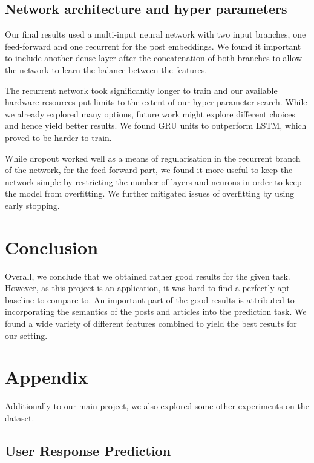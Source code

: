 \documentclass[acmsmall]{acmart}
\begin{document}
\subsection{Network architecture and hyper parameters}
Our final results used a multi-input neural network with two input branches, one feed-forward and one recurrent for the post embeddings. We found it important to include another dense layer after the concatenation of both branches to allow the network to learn the balance between the features.

The recurrent network took significantly longer to train and our available hardware resources put limits to the extent of our hyper-parameter search. While we already explored many options, future work might explore different choices and hence yield better results. We found GRU units to outperform LSTM, which proved to be harder to train. 

While dropout worked well as a means of regularisation in the recurrent branch of the network, for the feed-forward part, we found it more useful to keep the network simple by restricting the number of layers and neurons in order to keep the model from overfitting. We further mitigated issues of overfitting by using early stopping.

\section{Conclusion}

Overall, we conclude that we obtained rather good results for the given task. However, as this project is an application, it was hard to find a perfectly apt baseline to compare to. An important part of the good results is attributed to incorporating the semantics of the posts and articles into the prediction task. We found a wide variety of different features combined to yield the best results for our setting. 

\pagebreak

\section{Appendix}

Additionally to our main project, we also explored some other experiments on the dataset.

\subsection{User Response Prediction}
\end{document}
